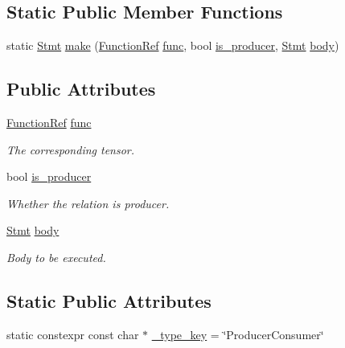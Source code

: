 \subsection*{Static Public Member Functions}
\begin{DoxyCompactItemize}
\item 
static \hyperlink{classtvm_1_1tir_1_1Stmt}{Stmt} \hyperlink{classtvm_1_1tir_1_1ProducerConsumerNode_acb3c6c5bd1be72e5429efe1a4fe51c7b}{make} (\hyperlink{classtvm_1_1tir_1_1FunctionRef}{Function\+Ref} \hyperlink{classtvm_1_1tir_1_1ProducerConsumerNode_afcbaebd57b61574b9c5a5d9484a99141}{func}, bool \hyperlink{classtvm_1_1tir_1_1ProducerConsumerNode_a98b5bfa381b562072ccce2e5c8e68f47}{is\+\_\+producer}, \hyperlink{classtvm_1_1tir_1_1Stmt}{Stmt} \hyperlink{classtvm_1_1tir_1_1ProducerConsumerNode_afcebfca1903bfab9575737ef4e032db8}{body})
\end{DoxyCompactItemize}
\subsection*{Public Attributes}
\begin{DoxyCompactItemize}
\item 
\hyperlink{classtvm_1_1tir_1_1FunctionRef}{Function\+Ref} \hyperlink{classtvm_1_1tir_1_1ProducerConsumerNode_afcbaebd57b61574b9c5a5d9484a99141}{func}
\begin{DoxyCompactList}\small\item\em The corresponding tensor. \end{DoxyCompactList}\item 
bool \hyperlink{classtvm_1_1tir_1_1ProducerConsumerNode_a98b5bfa381b562072ccce2e5c8e68f47}{is\+\_\+producer}
\begin{DoxyCompactList}\small\item\em Whether the relation is producer. \end{DoxyCompactList}\item 
\hyperlink{classtvm_1_1tir_1_1Stmt}{Stmt} \hyperlink{classtvm_1_1tir_1_1ProducerConsumerNode_afcebfca1903bfab9575737ef4e032db8}{body}
\begin{DoxyCompactList}\small\item\em Body to be executed. \end{DoxyCompactList}\end{DoxyCompactItemize}
\subsection*{Static Public Attributes}
\begin{DoxyCompactItemize}
\item 
static constexpr const char $\ast$ \hyperlink{classtvm_1_1tir_1_1ProducerConsumerNode_ae1504c476d474369fde0cffd4ef5a789}{\+\_\+type\+\_\+key} = \char`\"{}Producer\+Consumer\char`\"{}
\end{DoxyCompactItemize}


